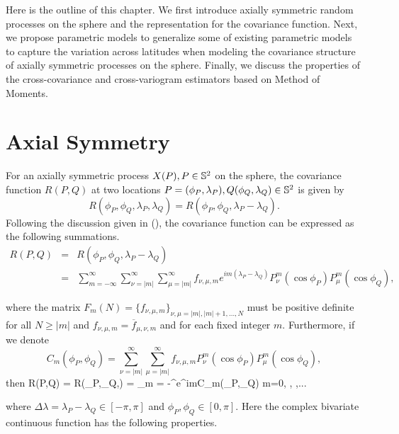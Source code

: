 Here is the outline of this chapter. We first introduce axially symmetric random processes on the sphere and the representation for the covariance function. Next, we propose parametric models to generalize some of existing parametric models to capture the variation across latitudes when modeling the covariance structure of axially symmetric processes on the sphere. Finally, we discuss the properties of the cross-covariance and cross-variogram estimators based on Method of Moments.
		
		
		\section{Axial Symmetry}

For an axially symmetric process $X(P), P \in \mathbb{S}^2$ on the sphere, the covariance function $R(P,Q)$ at two locations $P=(\phi_P, \lambda_P), Q(\phi_Q,\lambda_Q) \in \mathbb{S}^2$ is given by 					 
\[
R(\phi_P, \phi_Q, \lambda_P, \lambda_Q) = R(\phi_P, \phi_Q, \lambda_P-\lambda_Q).
\]
Following the discussion given in (\cite{Stein2007, Huang2012}), the covariance function can be expressed as the following summations.					
		\begin{eqnarray} \label{axially-symmetry-cov}
			R(P,Q)  & = & R(\phi_P, \phi_Q, \lambda_P-\lambda_Q) \nonumber \\
			& = & \sum_{m=-\infty}^{\infty} \sum_{\nu=|m|}^\infty \sum_{\mu=|m|}^\infty f_{\nu,\mu,m} e^{im (\lambda_P-\lambda_Q)} P_{\nu}^m(\cos \phi_P) P_{\mu}^m (\cos \phi_Q),
		\end{eqnarray}

\noi where the matrix $F_m(N) = \{ f_{\nu,\mu,m} \}_{\nu,\mu=|m|,|m|+1, \ldots, N }$ must be positive definite for all $N \ge |m|$ and $f_{\nu,\mu, m} = \overline{f}_{\mu, \nu, m}$ and for each fixed integer $m$. Furthermore, if we denote
\[
C_m(\phi_P, \phi_Q) = \sum_{\nu=|m|}^\infty \sum_{\mu=|m|}^\infty f_{\nu,\mu,m} P_{\nu}^m(\cos \phi_P) P_{\mu}^m (\cos \phi_Q),
\]
then 				
		\beq \label{R(PQ)-01}
		R(P,Q) = R(\phi_P,\phi_Q,\Delta\lambda) = \sum_{m = -\infty}^{\infty}e^{im\Delta\lambda}C_m(\phi_P,\phi_Q) \quad m=0, , ,...
		\eeq
		
\noi where $\Delta\lambda = \lambda_P - \lambda_Q \in [-\pi, \pi]$ and $\phi_P, \phi_Q \in [0,\pi]$. Here the complex bivariate continuous function \Cm has the following properties.

